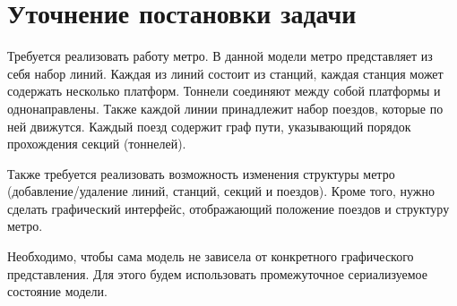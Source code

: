 \section{Уточнение постановки задачи}

Требуется реализовать работу метро.
В данной модели метро представляет из себя набор линий.
Каждая из линий состоит из станций, каждая станция может содержать несколько платформ.
Тоннели соединяют между собой платформы и однонаправлены.
Также каждой линии принадлежит набор поездов, которые по ней движутся.
Каждый поезд содержит граф пути, указывающий порядок прохождения секций (тоннелей).

Также требуется реализовать возможность изменения структуры метро (добавление/удаление линий, станций, секций и поездов).
Кроме того, нужно сделать графический интерфейс, отображающий положение поездов и структуру метро.

Необходимо, чтобы сама модель не зависела от конкретного графического представления.
Для этого будем использовать промежуточное сериализуемое состояние модели.
